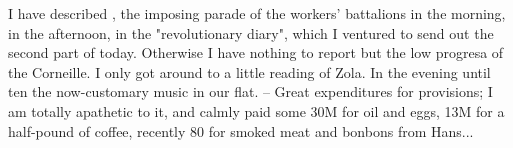 
I have described , the imposing parade of the workers' battalions in the morning,  in the afternoon, in the "revolutionary diary", which I ventured to send out the second part of today. Otherwise I have nothing to report but the low progresa of the Corneille. I only got around to a little reading of Zola. In the evening until ten the now-customary music in our flat. -- Great expenditures for provisions; I am totally apathetic to it, and calmly paid some 30M for oil and eggs, 13M for a half-pound of coffee, recently 80 for smoked meat and bonbons from Hans...

